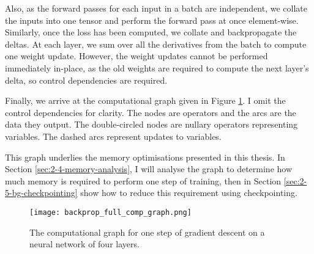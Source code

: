 Also, as the forward passes for each input in a batch are independent, we collate the inputs into one tensor and perform the forward pass at once element-wise.
Similarly, once the loss has been computed, we collate and backpropagate the deltas.
At each layer, we sum over all the derivatives from the batch to compute one weight update.
However, the weight updates cannot be performed immediately in-place, as the old weights are required to compute the next layer's delta, so control dependencies are required.

Finally, we arrive at the computational graph given in Figure \ref{fig:2-nn-comp-graph}.
I omit the control dependencies for clarity.
The nodes are operators and the arcs are the data they output.
The double-circled nodes are nullary operators representing variables.
The dashed arcs represent updates to variables.

This graph underlies the memory optimisations presented in this thesis.
In Section \ref{sec:2-4-memory-analysis}, I will analyse the graph to determine how much memory is required to perform one step of training,
then in Section \ref{sec:2-5-bg-checkpointing} show how to reduce this requirement using checkpointing.

\begin{figure}[t]
    \centering
    \texttt{[image: backprop\_full\_comp\_graph.png]}
    \caption{The computational graph for one step of gradient descent on a neural network of four layers.}
    \label{fig:2-nn-comp-graph}
\end{figure}

